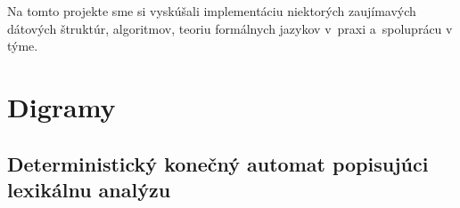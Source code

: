 \documentclass[a4paper, 11pt]{article}
\begin{document}
    Na tomto projekte sme si vyskúšali implementáciu niektorých zaujímavých dátových štruktúr, algoritmov, teoriu formálnych jazykov v~praxi a~spoluprácu v týme.
    
    \clearpage
    
    \section{Digramy}
    \subsection{Deterministický konečný automat popisujúci lexikálnu analýzu}
    \begin{figure}[h]
		\centering
	\end{figure}
\end{document}
